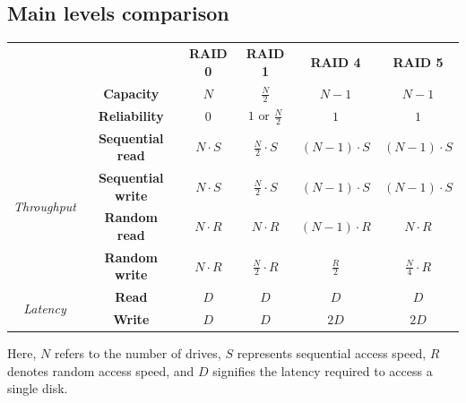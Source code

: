 \subsection{Main levels comparison}
\begin{table}[H]
    \centering
    \begin{tabular}{cc|c|c|c|c|}
    \cline{3-6}
    \textit{\textbf{}}                                        &                           & \textbf{RAID 0} & \textbf{RAID 1}             & \textbf{RAID 4} & \textbf{RAID 5}      \\ \cline{2-6} 
    \multicolumn{1}{c|}{\textit{}}                            & \textbf{Capacity}         & $N$             & $\frac{N}{2}$               & $N-1$           & $N-1$                \\
    \multicolumn{1}{c|}{\textit{}}                            & \textbf{Reliability}      & $0$             & $1 \text{ or } \frac{N}{2}$ & $1$             & $1$                  \\ \cline{2-6} 
    \multicolumn{1}{c|}{\multirow{4}{*}{\textit{Throughput}}} & \textbf{Sequential read}  & $N\cdot S$      & $\frac{N}{2}\cdot S$        & $(N-1)\cdot S$  & $(N-1)\cdot S$       \\
    \multicolumn{1}{c|}{}                                     & \textbf{Sequential write} & $N\cdot S$      & $\frac{N}{2}\cdot S$        & $(N-1)\cdot S$  & $(N-1)\cdot S$       \\
    \multicolumn{1}{c|}{}                                     & \textbf{Random read}      & $N\cdot R$      & $N \cdot R$                 & $(N-1)\cdot R$  & $N\cdot R$           \\
    \multicolumn{1}{c|}{}                                     & \textbf{Random write}     & $N\cdot R$      & $\frac{N}{2}\cdot R$        & $\frac{R}{2}$   & $\frac{N}{4}\cdot R$ \\ \cline{2-6} 
    \multicolumn{1}{c|}{\multirow{2}{*}{\textit{Latency}}}    & \textbf{Read}             & $D$             & $D$                         & $D$             & $D$                  \\
    \multicolumn{1}{c|}{}                                     & \textbf{Write}            & $D$             & $D$                         & $2D$            & $2D$                 \\ \cline{2-6} 
    \end{tabular}
\end{table}
Here, $N$ refers to the number of drives, $S$ represents sequential access speed, $R$ denotes random access speed, and $D$ signifies the latency required to access a single disk.
